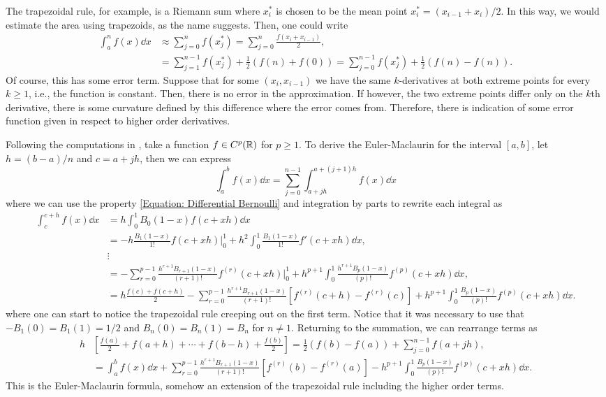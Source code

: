 The trapezoidal rule, for example, is a Riemann sum where $x_i^*$ is chosen to be the mean point $x_i^* = (x_{i-1} + x_i)/2$. In this way, we would estimate the area using trapezoids, as the name suggests. Then, one could write
\begin{align}
	\int_{a}^{n} f(x) \dd x & \approx \sum_{j = 0}^{n} f(x_j^*) = \sum_{j = 0}^{n} \frac{f(x_{i} + x_{i-1})}{2}, \\
	& = \sum_{j = 1}^{n-1} f(x_j^*) + \frac{1}{2} \left( f(n) + f(0) \right) = \sum_{j = 0}^{n-1} f(x_j^*) + \frac{1}{2} \left( f(n) - f(n) \right) .
\end{align}
Of course, this has some error term. Suppose that for some $(x_i, x_{i-1})$ we have the same $k$-derivatives at both extreme points for every $k\geq 1$, i.e., the function is constant. Then, there is no error in the approximation. If however, the two extreme points differ only on the $k$th derivative, there is some curvature defined by this difference where the error comes from. Therefore, there is indication of some error function given in respect to higher order derivatives.

Following the computations in \cite{Trapezoidal-Maclaurin}, take a function $f \in C^p(\mathbb{R})$ for $p \geq 1$. To derive the Euler-Maclaurin for the interval $[a,b]$, let $h = (b - a)/n$ and $c = a + j h$, then we can express
\begin{equation}
	\int_{a}^{b} f(x) \dd x = \sum_{j=0}^{n-1} \int_{a+j h}^{a+(j+1)h} f(x) \dd x
\end{equation}
where we can use the property \eqref{Equation: Differential Bernoulli} and integration by parts to rewrite each integral as
\begin{align}
	\int_{c}^{c+h} f(x) \dd x & = h \int_{0}^{1} B_0(1-x) f(c+xh) \dd x \\
	& = - h \frac{B_1(1-x)}{1!} f(c + xh) |_0^1 + h^2 \int_{0}^{1} \frac{B_1(1-x)}{1!} f'(c+xh) \dd x, \\
	& \vdots \\
	& = - \sum_{r = 0}^{p-1} \frac{h^{r+1} B_{r+1}(1-x)}{(r+1)!} f^{(r)}(c+xh) |_0^1 + h^{p+1} \int_0^1 \frac{h^{r+1} B_{p}(1-x)}{(p)!} f^{(p)}(c+xh) \dd x, \\
	& = h \frac{f(c) + f(c+h)}{2} - \sum_{r = 0}^{p-1} \frac{h^{r+1} B_{r+1}(1-x)}{(r+1)!} \left[ f^{(r)}(c+h) - f^{(r)}(c) \right] + h^{p+1} \int_0^1 \frac{B_{p}(1-x)}{(p)!} f^{(p)}(c+xh) \dd x. 
\end{align}
where one can start to notice the trapezoidal rule creeping out on the first term. Notice that it was necessary to use that $ - B_1(0) = B_1(1) = 1/2$ and $B_n(0) = B_n(1) = B_n$ for $n\neq1$. Returning to the summation, we can rearrange terms as
\begin{align}
	h & \left[ \frac{f(a)}{2} + f(a+h) + \cdots + f(b-h) + \frac{f(b)}{2} \right] = \frac{1}{2} (f(b) - f(a)) + \sum_{j=0}^{n-1} f(a + j h), \\
	& = \int_{a}^{b} f(x) \dd x + \sum_{r = 0}^{p-1} \frac{h^{r+1} B_{r+1}(1-x)}{(r+1)!} \left[ f^{(r)}(b) - f^{(r)}(a) \right] - h^{p+1} \int_0^1 \frac{B_{p}(1-x)}{(p)!} f^{(p)}(c+xh) \dd x. 
\end{align}
This is the Euler-Maclaurin formula, somehow an extension of the trapezoidal rule including the higher order terms.